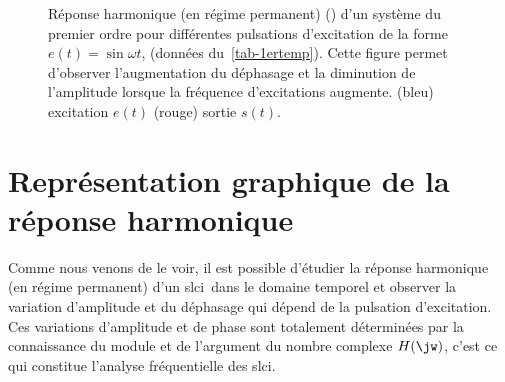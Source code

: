 \begin{figure}[!h]
\begin{center}
\caption{Réponse harmonique (en régime permanent) () d'un système 
         du premier ordre pour différentes pulsations d'excitation de la forme 
         $e(t)=\sin{\omega t}$, (données du~\cref{tab-1ertemp}). Cette figure
         permet d'observer l'augmentation du déphasage et la diminution de 
         l'amplitude lorsque la fréquence d'excitations augmente. (bleu) 
         excitation $e(t)$ (rouge) sortie $s(t)$.\label{fig-repham}}
\end{center}
\end{figure}







\newpage
\section{Représentation graphique de la réponse harmonique}


Comme nous venons de le voir, il est possible d'étudier
la réponse harmonique (en régime permanent) d'un \gls{slci}~dans le domaine 
temporel et observer la variation d'amplitude et du 
déphasage qui dépend de la pulsation d'excitation. Ces variations 
d'amplitude et de phase sont totalement déterminées par la 
connaissance du module et de l'argument du nombre complexe $H(\jw)$, 
c'est ce qui constitue l'analyse fréquentielle des \gls{slci}.

